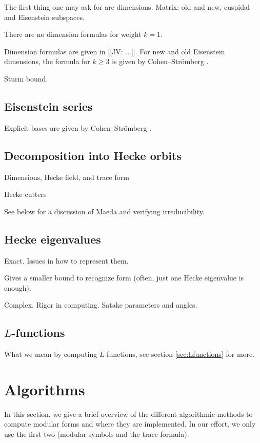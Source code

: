 \documentclass[11pt]{amsart}
\numberwithin{equation}{subsection}
\theoremstyle{plain}
\theoremstyle{definition}
\newcommand{\jv}[1]{{\color{red} \textsf{[[JV: #1]]}}}
\begin{document}
The first thing one may ask for are dimensions.  Matrix: old and new, cuspidal and Eisenstein subspaces.

There are no dimension formulas for weight $k=1$.

Dimension formulas are given in \jv{...}.  For new and old Eisenstein dimensions, the formula for $k \geq 3$ is given by Cohen--Str\"omberg \cite[Propositions 7.5.14 and 7.5.20]{CohenStroemberg}.

Sturm bound.

\subsection{Eisenstein series}

Explicit bases are given by Cohen--Str\"omberg \cite[Theorem 7.5.16 and 7.5.21]{CohenStroemberg}.

\subsection{Decomposition into Hecke orbits}

Dimensions, Hecke field, and trace form

Hecke cutters

See below for a discussion of Maeda and verifying irreducibility.

\subsection{Hecke eigenvalues}

Exact.  Issues in how to represent them.

Gives a smaller bound to recognize form (often, just one Hecke eigenvalue is enough).

Complex.  Rigor in computing.  Satake parameters and angles.

\subsection{$L$-functions}

What we mean by computing $L$-functions, see section \ref{sec:Lfunctions} for more.

\section{Algorithms} \label{sec:algs}

In this section, we give a brief overview of the different algorithmic methods to compute modular forms and where they are implemented.  In our effort, we only use the first two (modular symbols and the trace formula).  
\end{document}
